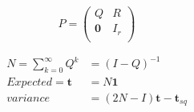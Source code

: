 \documentclass{report}
\begin{document}
\begin{equation*}
	P  = \left(
	\begin{array}{cc}
	Q & R \\
		\mathbf{0} & I_r \\
	\end{array} \right)
\end{equation*}

\begin{align*}
	N = \sum_{k=0}^{\infty} Q^k &= (I-Q)^{-1}\\
	Expected = \mathbf{t} &= N\mathbf{1} \\
	variance &= (2N-I)\mathbf{t} - \mathbf{t}_{sq}
\end{align*}
\end{document}
